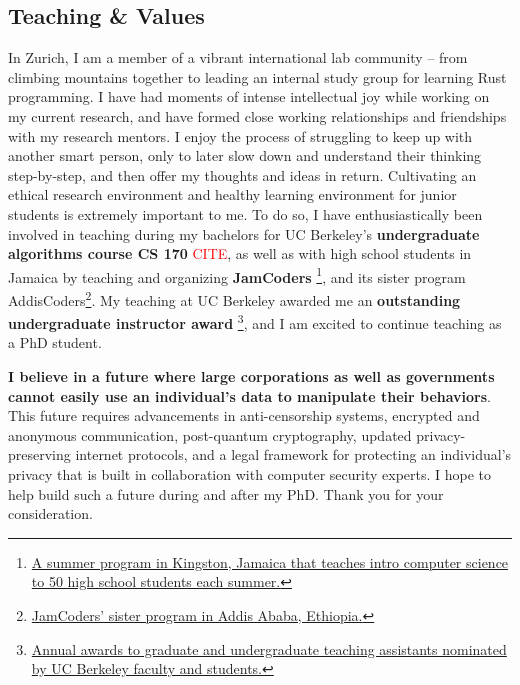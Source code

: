 \documentclass{article}
\newcommand{\TODO}[1]{\textcolor{red}{#1}}
\newcommand{\aftersep}{\vspace{-0.3cm}}
\newcommand{\beforesep}{\vspace{-0.2cm}}
\begin{document}
\aftersep
\subsection*{Teaching \& Values}
\beforesep

In Zurich, I am a member of a vibrant international lab community -- from climbing mountains together to leading an internal study group for learning Rust programming. I have had moments of intense intellectual joy while working on my current research, and have formed close working relationships and friendships with my research mentors. I enjoy the process of struggling to keep up with another smart person, only to later slow down and understand their thinking step-by-step, and then offer my thoughts and ideas in return. Cultivating an ethical research environment and healthy learning environment for junior students is extremely important to me. To do so, I have enthusiastically been involved in teaching during my bachelors for UC Berkeley’s \textbf{undergraduate algorithms course CS 170} \TODO{CITE}, as well as with high school students in Jamaica by teaching and organizing \textbf{JamCoders} \footnote{\href{https://jamcoders.org.jm/}{A summer program in Kingston, Jamaica that teaches intro computer science to 50 high school students each summer.}}, and its sister program AddisCoders\footnote{\href{https://www.addiscoder.com/}{JamCoders' sister program in Addis Ababa, Ethiopia.}}. My teaching at UC Berkeley awarded me an \textbf{outstanding undergraduate instructor award} \footnote{\href{https://gsi.berkeley.edu/programs-services/award-programs/ogsi}{Annual awards to graduate and undergraduate teaching assistants nominated by UC Berkeley faculty and students.}}, and I am excited to continue teaching as a PhD student. 

\textbf{I believe in a future where large corporations as well as governments cannot easily use an individual's data to manipulate their behaviors}. This future requires advancements in anti-censorship systems, encrypted and anonymous communication, post-quantum cryptography, updated privacy-preserving internet protocols, and a legal framework for protecting an individual's privacy that is built in collaboration with computer security experts. I hope to help build such a future during and after my PhD. Thank you for your consideration.



% 
\end{document}
